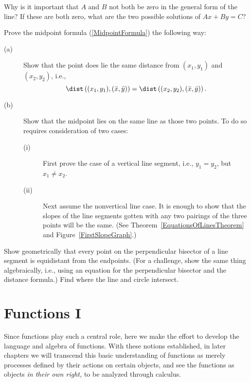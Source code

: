 \bhw Why is it important that $A$ and $B$ not both be zero
in the general form of the line?  If these are both zero,
what are the two possible solutions of $Ax+By=C$? 
\ehw

\bhw Prove the midpoint formula (\ref{MidpointFormula}) the
following way:
\begin{description}
\item[(a)] Show that the point does lie the same distance
from $(x_1,y_1)$ and $(x_2,y_2)$, i.e.,
$$\dist\left((x_1,y_1),(\bar{x},\bar{y})\right)
=\dist\left((x_2,y_2),(\bar{x},\bar{y})\right).$$
\item[(b)] Show that the midpoint lies on the same
line as those two points.  To do so requires 
consideration of two cases:
\begin{description}
\item[(i)] First prove the case of a  vertical line segment,
i.e., $y_1=y_2$, but $x_1\ne x_2$.
\item[(ii)] Next assume the nonvertical line case.  It
is enough to show that the slopes of the line segments
gotten with any two pairings of the three points will be
the same. (See Theorem~\ref{EquationsOfLinesTheorem}
and Figure~\ref{FirstSlopeGraph}.)
\end{description}
\end{description}
\label{MidpointProofExercise}\ehw
\bhw Show geometrically that every point on the perpendicular
bisector of a line segment is equidistant from the endpoints. 
(For a challenge, show the same thing algebraically, i.e., 
using an equation for the perpendicular bisector
and the distance formula.)
\ehw
\bhw Find where the line and circle intersect.
\ehw


\newpage\section{Functions I\label{FirstFunctionsSection}}


Since functions play such a central role, here we make the
effort to develop the language and algebra of functions.
With these notions established, in later chapters we
will transcend 
this basic  understanding of functions as merely processes
defined by their actions on certain objects,
and see  the functions as
objects {\it in their own right, }%
to be analyzed through
calculus.

